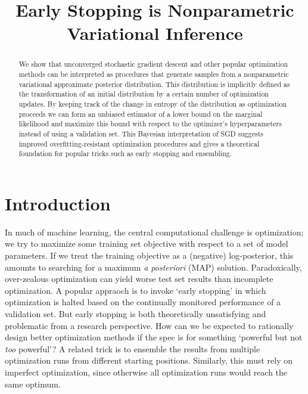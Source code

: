 \documentclass[]{article}
\title{Early Stopping is Nonparametric Variational Inference}
\author{} %
\begin{document}
\maketitle

\begin{abstract}
We show that unconverged stochastic gradient descent and other popular
optimization methods can be interpreted as procedures that generate samples from
a nonparametric variational approximate posterior distribution.  This
distribution is implicitly defined as the transformation of an initial
distribution by a certain number of optimization updates. By keeping track of
the change in entropy of the distribution as optimization proceeds we can form
an unbiased estimator of a lower bound on the marginal likelihood and maximize
this bound with respect to the optimizer's hyperparameters instead of using a
validation set.  This Bayesian interpretation of SGD suggests improved
overfitting-resistant optimization procedures and gives a theoretical foundation
for popular tricks such as early stopping and ensembling.
\end{abstract}

\section{Introduction}

In much of machine learning, the central computational challenge is
optimization; we try to maximize some training set objective with respect to a
set of model parameters. If we treat the training objective as a (negative)
log-posterior, this amounts to searching for a maximum \emph{a posteriori} (MAP)
solution. Paradoxically, over-zealous optimization can yield worse test set
results than incomplete optimization. A popular appraoch is to invoke `early
stopping' in which optimization is halted based on the continually monitored
performance of a validation set. But early stopping is both theoretically
unsatisfying and problematic from a research perspective.  How can we be
expected to rationally design better optimization methods if the spec is for
something `powerful but not \emph{too} powerful'? A related trick is to ensemble
the results from multiple optimization runs from different starting
positions. Similarly, this must rely on imperfect optimization, since otherwise
all optimization runs would reach the same optimum.
\end{document}
